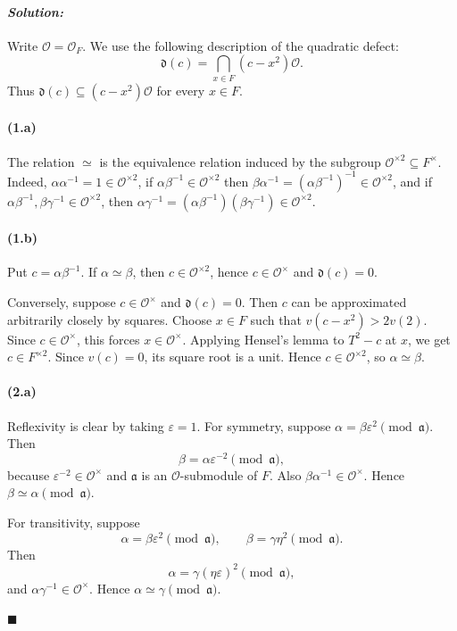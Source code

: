 \documentclass[12pt, a4paper]{article}
\newenvironment{solution}
  {\paragraph{\textit{Solution:}}\par\medskip}
  {\hfill$\blacksquare$\vspace{0.1cm}}
\begin{document}
\begin{solution}

Write $\mathcal O=\mathcal O_F$. We use the following description of the
quadratic defect:
\[
    \mathfrak d(c)=\bigcap_{x\in F}(c-x^2)\mathcal O .
\]
Thus $\mathfrak d(c)\subseteq (c-x^2)\mathcal O$ for every $x\in F$.

\paragraph*{(1.a)}
The relation $\simeq$ is the equivalence relation induced by the subgroup
$\mathcal O^{\times 2}\subseteq F^\times$. Indeed,
$\alpha\alpha^{-1}=1\in\mathcal O^{\times 2}$, if
$\alpha\beta^{-1}\in\mathcal O^{\times 2}$ then
$\beta\alpha^{-1}=(\alpha\beta^{-1})^{-1}\in\mathcal O^{\times 2}$, and if
$\alpha\beta^{-1},\beta\gamma^{-1}\in\mathcal O^{\times 2}$, then
$\alpha\gamma^{-1}=(\alpha\beta^{-1})(\beta\gamma^{-1})\in
\mathcal O^{\times 2}$.

\paragraph*{(1.b)}
Put $c=\alpha\beta^{-1}$. If $\alpha\simeq\beta$, then
$c\in\mathcal O^{\times 2}$, hence $c\in\mathcal O^\times$ and
$\mathfrak d(c)=0$.

Conversely, suppose $c\in\mathcal O^\times$ and $\mathfrak d(c)=0$. Then $c$
can be approximated arbitrarily closely by squares. Choose $x\in F$ such that
$v(c-x^2)>2v(2)$. Since $c\in\mathcal O^\times$, this forces $x\in\mathcal
O^\times$. Applying Hensel's lemma to $T^2-c$ at $x$, we get $c\in F^{\times
2}$. Since $v(c)=0$, its square root is a unit. Hence
$c\in\mathcal O^{\times 2}$, so $\alpha\simeq\beta$.

\paragraph*{(2.a)}
Reflexivity is clear by taking $\varepsilon=1$. For symmetry, suppose
$\alpha=\beta\varepsilon^2 \pmod{\mathfrak a}$. Then
\[
    \beta=\alpha\varepsilon^{-2}\pmod{\mathfrak a},
\]
because $\varepsilon^{-2}\in\mathcal O^\times$ and $\mathfrak a$ is an
$\mathcal O$-submodule of $F$. Also $\beta\alpha^{-1}\in\mathcal O^\times$.
Hence $\beta\simeq\alpha\pmod{\mathfrak a}$.

For transitivity, suppose
\[
    \alpha=\beta\varepsilon^2\pmod{\mathfrak a},
    \qquad
    \beta=\gamma\eta^2\pmod{\mathfrak a}.
\]
Then
\[
    \alpha=\gamma(\eta\varepsilon)^2\pmod{\mathfrak a},
\]
and $\alpha\gamma^{-1}\in\mathcal O^\times$. Hence
$\alpha\simeq\gamma\pmod{\mathfrak a}$.


\end{solution}
\end{document}
